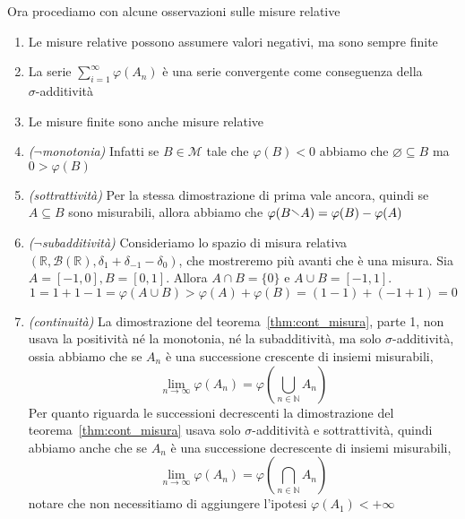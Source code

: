 Ora procediamo con alcune osservazioni sulle misure relative

\begin{enumerate}[label = \arabic*.]
    \item Le misure relative possono assumere valori negativi, ma sono sempre
        finite
    \item La serie \(\sum_{i=1}^{\infty} \varphi(A_{n})\) è una serie
        convergente come conseguenza della \\ \(\sigma\)-additività
    \item Le misure finite sono anche misure relative
    \item \emph{(\(\lnot\)monotonia)} Infatti se \(B \in \mathcal{M}\) tale che
        \(\varphi(B) < 0\) abbiamo che \(\varnothing \subseteq B \) ma \(0 >
        \varphi(B)\) 
    \item \emph{(sottrattività)} Per la stessa dimostrazione di prima vale
        ancora, quindi se \(A \subseteq B \) sono misurabili, allora abbiamo che
        \(\varphi(B \sminus A) = \varphi(B) - \varphi(A)\) 
    \item \emph{(\(\lnot\)subadditività)} Consideriamo lo spazio di misura
        relativa \((\mathbb{R}, \mathcal{B}(\mathbb{R}), \delta_1 + \delta_{-1}
        - \delta_0)\), che mostreremo più avanti che è una misura. Sia \(A =
        [-1, 0], B = [0, 1]\). Allora \(A \cap B = \{0\} \) e \(A \cup B = [-1,
        1]\).
        \[
            1 = 1 + 1 - 1 = \varphi(A \cup B) > \varphi(A) + \varphi(B) = (1 -
            1) + (-1 + 1) = 0
        \]
    \item \emph{(continuità)} La dimostrazione del
        teorema~\ref{thm:cont_misura}, parte 1,
        non usava la positività né la monotonia, né la subadditività, ma solo
        \(\sigma\)-additività, ossia abbiamo che
        se \(A_{n}\) è una successione crescente di insiemi misurabili,
        \[
            \lim_{n \to \infty} \varphi(A_{n}) = \varphi\left( \bigcup_{n \in
            \mathbb{N}} A_{n} \right) 
        \]
        Per quanto riguarda le successioni decrescenti la dimostrazione del
        teorema~\ref{thm:cont_misura} usava solo \(\sigma\)-additività e
        sottrattività, quindi abbiamo anche che se \(A_{n}\) è una successione
        decrescente di insiemi misurabili,
        \[
            \lim_{n \to \infty} \varphi(A_{n}) = \varphi \left( \bigcap_{n \in
            \mathbb{N}} A_{n} \right)
        \] 
        notare che non necessitiamo di aggiungere l'ipotesi \(\varphi(A_{1}) <
        +\infty\) 
\end{enumerate}
